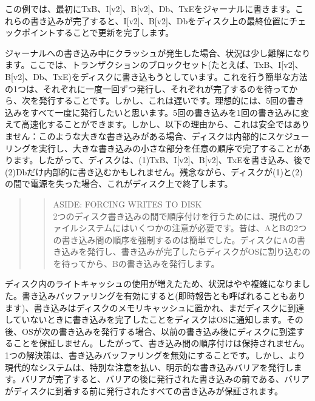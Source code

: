 この例では、最初にTxB、I{[}v2{]}、B{[}v2{]}、Db、TxEをジャーナルに書きます。これらの書き込みが完了すると、I{[}v2{]}、B{[}v2{]}、Dbをディスク上の最終位置にチェックポイントすることで更新を完了します。

ジャーナルへの書き込み中にクラッシュが発生した場合、状況は少し難解になります。ここでは、トランザクションのブロックセット(たとえば、TxB、I{[}v2{]}、B{[}v2{]}、Db、TxE)をディスクに書き込もうとしています。これを行う簡単な方法の1つは、それぞれに一度一回ずつ発行し、それぞれが完了するのを待ってから、次を発行することです。しかし、これは遅いです。理想的には、5回の書き込みをすべて一度に発行したいと思います。5回の書き込みを1回の書き込みに変えて高速化することができます。しかし、以下の理由から、これは安全ではありません：このような大きな書き込みがある場合、ディスクは内部的にスケジューリングを実行し、大きな書き込みの小さな部分を任意の順序で完了することがあります。したがって、ディスクは、(1)TxB、I{[}v2{]}、B{[}v2{]}、TxEを書き込み、後で(2)Dbだけ内部的に書き込むかもしれません。残念ながら、ディスクが(1)と(2)の間で電源を失った場合、これがディスク上で終了します。

\begin{quote}
\begin{quote}
ASIDE: FORCING WRITES TO DISK\\
2つのディスク書き込みの間で順序付けを行うためには、現代のファイルシステムにはいくつかの注意が必要です。昔は、AとBの2つの書き込み間の順序を強制するのは簡単でした。ディスクにAの書き込みを発行し、書き込みが完了したらディスクがOSに割り込むのを待ってから、Bの書き込みを発行します。
\end{quote}
\end{quote}

ディスク内のライトキャッシュの使用が増えたため、状況はやや複雑になりました。書き込みバッファリングを有効にすると(即時報告とも呼ばれることもあります)、書き込みはディスクのメモリキャッシュに置かれ、まだディスクに到達していないときに書き込みを完了したことをディスクはOSに通知します。その後、OSが次の書き込みを発行する場合、以前の書き込み後にディスクに到達することを保証しません。したがって、書き込み間の順序付けは保持されません。1つの解決策は、書き込みバッファリングを無効にすることです。しかし、より現代的なシステムは、特別な注意を払い、明示的な書き込みバリアを発行します。バリアが完了すると、バリアの後に発行された書き込みの前である、バリアがディスクに到着する前に発行されたすべての書き込みが保証されます。

